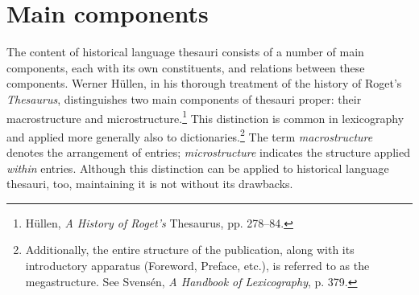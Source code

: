 \section{Main components}
\label{sect:Stolk_thes-content:MainComponents}


The content of historical language thesauri consists of a number of main components, each with its own constituents, and relations between these components. 
Werner Hüllen, in his thorough treatment of the history of Roget's \textit{Thesaurus}, distinguishes two main components of thesauri proper: their macrostructure and microstructure.\footnote{Hüllen, \textit{A History of Roget's} Thesaurus, pp. 278–84.} 
This distinction is common in lexicography and applied more generally also to dictionaries.\footnote{Additionally, the entire structure of the publication, along with its introductory apparatus (Foreword, Preface, etc.), is referred to as the megastructure. See Svensén, \textit{A Handbook of Lexicography}, p. 379.} %
The term \textit{macrostructure} denotes the arrangement of entries; \textit{microstructure} indicates the structure applied \textit{within} entries. Although this distinction can be applied to historical language thesauri, too, maintaining it is not without its drawbacks. 

